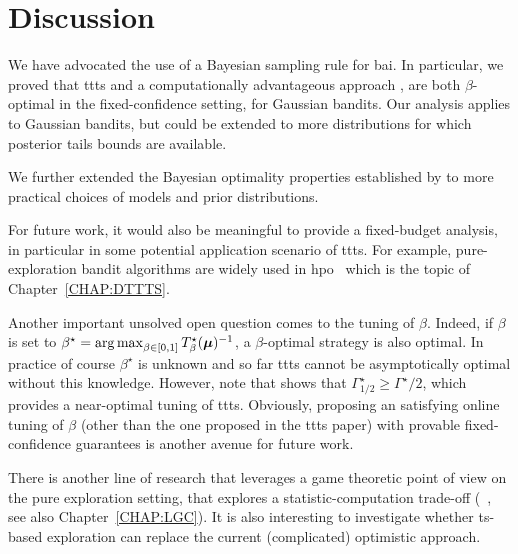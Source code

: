 \section{Discussion}\label{sec:t3c.discussion}

We have advocated the use of a Bayesian sampling rule for \gls{bai}. In particular, we proved that \gls{ttts} and a computationally advantageous approach \TCC, are both $\beta$-optimal in the fixed-confidence setting, for Gaussian bandits. Our analysis applies to Gaussian bandits, but could be extended to more distributions for which posterior tails bounds are available.

We further extended the Bayesian optimality properties established by \cite{russo2016ttts} to more practical choices of models and prior distributions. 

For future work, it would also be meaningful to provide a fixed-budget analysis, in particular in some potential application scenario of \gls{ttts}. For example, pure-exploration bandit algorithms are widely used in \gls{hpo}~\citep{hoffman2014bayesgap,li2017hyperband} which is the topic of Chapter~\ref{CHAP:DTTTS}.

Another important unsolved open question comes to the tuning of $\beta$. Indeed, if $\beta$ is set to $\beta^\star = \operatorname*{arg\,max}_{\beta \in [0,1]} T_{\beta}^\star({\boldsymbol \mu})^{-1}$, a $\beta$-optimal strategy is also optimal. In practice of course $\beta^\star$ is unknown and so far \gls{ttts} cannot be asymptotically optimal without this knowledge. However, note that \cite{russo2016ttts} shows that $\Gamma^\star_{1/2} \geq \Gamma^{\star}/2$, which provides a near-optimal tuning of \gls{ttts}. Obviously, proposing an satisfying online tuning of $\beta$ (other than the one proposed in the \gls{ttts} paper) with provable fixed-confidence guarantees is another avenue for future work.

There is another line of research that leverages a game theoretic point of view on the pure exploration setting, that explores a statistic-computation trade-off (~\citealt{menard2019lma,degenne2019game}, see also Chapter~\ref{CHAP:LGC}). It is also interesting to investigate whether \gls{ts}-based exploration can replace the current (complicated) optimistic approach.



